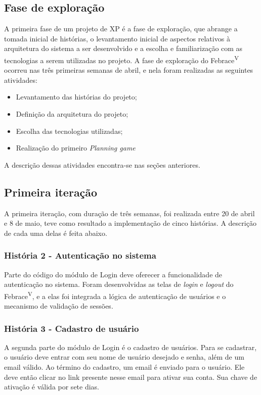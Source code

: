   \subsection{Fase de exploração}
    A primeira fase de um projeto de XP é a fase de exploração\cite{beck04}, que abrange a tomada inicial de histórias, o levantamento inicial de aspectos relativos à arquitetura do sistema a ser desenvolvido e a escolha e familiarização com as tecnologias a serem utilizadas no projeto.
    A fase de exploração do Febrace\textsuperscript{V} ocorreu nas três primeiras semanas de abril, e nela foram realizadas as seguintes atividades:

    \begin{itemize}
      \item
        Levantamento das histórias do projeto;
      \item
        Definição da arquitetura do projeto;
      \item
        Escolha das tecnologias utilizadas;
      \item
        Realização do primeiro \textit{Planning game}
    \end{itemize}

    A descrição dessas atividades encontra-se nas seções anteriores.

  \subsection{Primeira iteração}
    A primeira iteração, com duração de três semanas, foi realizada entre 20 de abril e 8 de maio, teve como resultado a implementação de cinco histórias. A descrição de cada uma delas é feita abaixo.

    \subsubsection{História 2 - Autenticação no sistema}
      Parte do código do módulo de Login deve oferecer a funcionalidade de autenticação no sistema. Foram desenvolvidas as telas de \textit{login} e \textit{logout} do Febrace\textsuperscript{V}, e a elas foi integrada a lógica de autenticação de usuários e o mecanismo de validação de sessões.

    \subsubsection{História 3 - Cadastro de usuário}
      A segunda parte do módulo de Login é o cadastro de usuários. Para se cadastrar, o usuário deve entrar com seu nome de usuário desejado e senha, além de um email válido. Ao término do cadastro, um email é enviado para o usuário. Ele deve então clicar no link presente nesse email para ativar sua conta. Sua chave de ativação é válida por sete dias.

